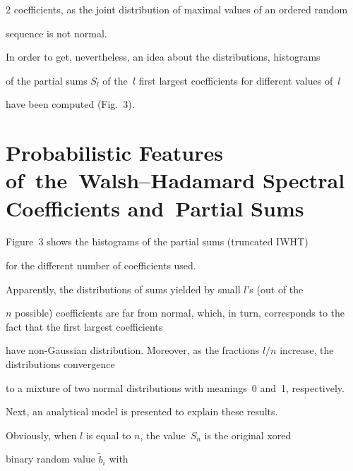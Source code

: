 \begin{multicols}{2}
coefficients, as the joint distribution of maximal values of an ordered random 

sequence  is not normal.



In order to get, nevertheless, an idea about the distributions, histograms 

of the partial sums $S_l$ of the~$l$ first largest coefficients for different values of~$l$ 

have been computed (Fig.~3).



\vspace*{-6pt}



\section{Probabilistic Features of~the~Walsh--Hadamard Spectral Coefficients and~Partial Sums}



\vspace*{-2pt}



\noindent

Figure~3 shows the histograms of  the partial sums (truncated IWHT) 

for the  different number of coefficients used.



Apparently, the distributions of sums yielded by small $l$'s (out of the

$n$ possible) coefficients are far from normal, which, in turn, corresponds to the fact that the first largest coefficients

have non-Gaussian distribution. Moreover, as the fractions $l/n$ increase, the distributions convergence

 to a mixture of two normal distributions with meanings~0 and~1, respectively.

 

 Next,  an analytical model is presented to explain these results.

Obviously, when $l$ is equal to $n$, the value~$S_n$ is the original xored

binary random value  $\tilde b_i$ with\linebreak\vspace*{-12pt}



\pagebreak




\end{multicols}
